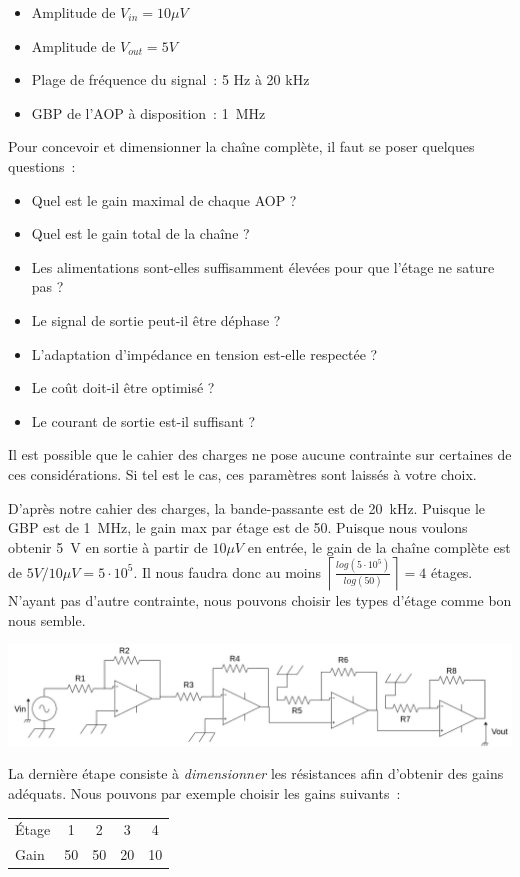 \begin{itemize}
  \item Amplitude de $V_{in} = 10 \mu V$
  \item Amplitude de $V_{out} = 5 V$
  \item Plage de fréquence du signal~: 5 Hz à 20 kHz
  \item GBP de l'AOP à disposition~: 1~MHz
\end{itemize}

Pour concevoir et dimensionner la chaîne complète, il faut se poser quelques questions~:

\begin{itemize}
  \item Quel est le gain maximal de chaque AOP ?
  \item Quel est le gain total de la chaîne ?
  \item Les alimentations sont-elles suffisamment élevées pour que l'étage ne sature pas ?
  \item Le signal de sortie peut-il être déphase ?
  \item L'adaptation d'impédance en tension est-elle respectée ?
  \item Le coût doit-il être optimisé ?
  \item Le courant de sortie est-il suffisant ?
\end{itemize}

Il est possible que le cahier des charges ne pose aucune contrainte sur certaines de ces considérations.
Si tel est le cas, ces paramètres sont laissés à votre choix.

D'après notre cahier des charges, la bande-passante est de 20~kHz.
Puisque le GBP est de 1~MHz, le gain max par étage est de 50.
Puisque nous voulons obtenir 5~V en sortie à partir de $10 \mu V$ en entrée, le gain de la chaîne complète est de $5V/10\mu V = 5\cdot 10^5$.
Il nous faudra donc au moins $\left\lceil \frac{log(5\cdot 10^5)}{log(50)} \right\rceil = 4$ étages.
N'ayant pas d'autre contrainte, nous pouvons choisir les types d'étage comme bon nous semble.

\includegraphics[width=\textwidth]{chaine-AOP.drawio.png}

La dernière étape consiste à \textit{dimensionner} les résistances afin d'obtenir des gains adéquats.
Nous pouvons par exemple choisir les gains suivants~:
\begin{center}
\begin{tabular}{|l|cccc|}\hline
Étage & 1 & 2 & 3 & 4 \\
Gain & 50 & 50 & 20 & 10 \\ \hline
\end{tabular}
\end{center}

